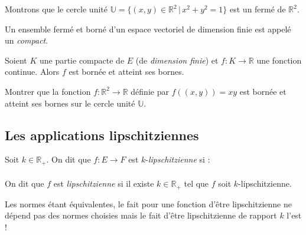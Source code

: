 \documentclass[french,11pt,twoside]{VcCours}
\begin{document}
\newpage
\begin{Exemple} Montrons que le cercle unité $\mathbb{U} = \lbrace (x,y) \in \mathbb{R}^2 \, \vert \, x^2+y^2=1 \rbrace$ est un fermé de $\mathbb{R}^2$.

\vspace{4cm}

%
\end{Exemple}

\begin{Definition}{} Un ensemble fermé et borné d'un espace vectoriel de dimension finie est appelé un \emph{compact}.
\end{Definition}

\begin{Theoreme}{} Soient $K$ une partie compacte de $E$ (de \emph{dimension finie}) et $f : K \rightarrow \mathbb{R}$ une fonction continue. Alors $f$ est bornée et atteint ses bornes.
\end{Theoreme}

\medskip


\begin{ApplicationDirecte} Montrer que la fonction $f : \mathbb{R}^2 \rightarrow \mathbb{R}$ définie par $f((x,y))= xy$ est bornée et atteint ses bornes sur le cercle unité $\mathbb{U}$.
\end{ApplicationDirecte}

\subsection{Les applications lipschitziennes}

\begin{Definition}{} Soit $k \in \mathbb{R}_+$. On dit que $f : E \rightarrow F$ est $k$-\emph{lipschitzienne} si :
$$ \phantom{\forall (x,y) \in E^2, \quad \Vert f(x)-f(y) \Vert_F \leq k \Vert x-y \Vert_E}$$
On dit que $f$ est \emph{lipschitzienne} si il existe $k \in \mathbb{R}_+$ tel que $f$ soit $k$-lipschitzienne.
\end{Definition}

\begin{Remarque}[\alerte]{} Les normes étant équivalentes, le fait pour une fonction d'être lipschitzienne ne dépend pas des normes choisies mais le fait d'être lipschitzienne de rapport $k$ l'est !
\end{Remarque}
\end{document}
